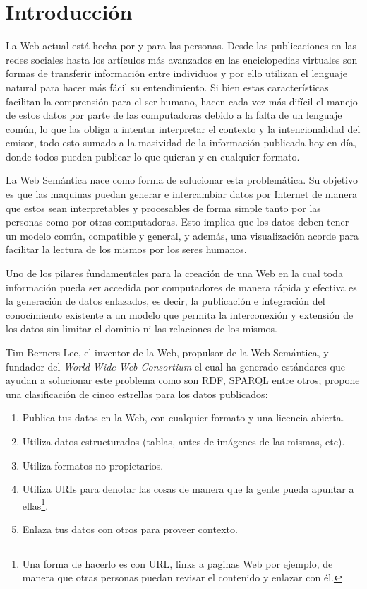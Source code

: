 
\chapter{Introducción}\label{ch:intro}

La Web actual está hecha por y para las personas. Desde las publicaciones en las
redes sociales hasta los artículos más avanzados en las enciclopedias virtuales
son formas de transferir información entre individuos y por ello utilizan el
lenguaje natural para hacer más fácil su entendimiento. Si bien estas
características facilitan la comprensión para el ser humano, hacen cada
vez más difícil el manejo de estos datos por parte de las computadoras debido a
la falta de un lenguaje común, lo que las obliga a intentar interpretar el
contexto y la intencionalidad del emisor, todo esto sumado a la masividad de la
información publicada hoy en día, donde todos pueden publicar lo que quieran y
en cualquier formato.

La Web Semántica nace como forma de solucionar esta problemática.
Su objetivo es que las maquinas puedan generar e intercambiar datos por Internet 
de manera que estos sean interpretables y procesables de forma simple tanto por
las personas como por otras computadoras.
Esto implica que los datos deben tener un modelo común, compatible y general,
y además, una visualización acorde para facilitar la lectura de los mismos por
los seres humanos.

Uno de los pilares fundamentales para la creación de una Web en la cual toda
información pueda ser accedida por computadores de manera rápida y efectiva es
la generación de datos enlazados, es decir, la publicación e integración del 
conocimiento existente a un modelo que permita la interconexión y extensión de
los datos sin limitar el dominio ni las relaciones de los mismos.

Tim Berners-Lee, el inventor de la Web, propulsor de la Web Semántica,
y fundador del \emph{World Wide Web Consortium} el cual ha generado estándares
que ayudan a solucionar este problema como son RDF, SPARQL entre otros;
propone una clasificación de cinco estrellas para los datos publicados:
\begin{enumerate}
  \item
    Publica tus datos en la Web, con cualquier formato y una licencia abierta.
  \item
    Utiliza datos estructurados (tablas, antes de imágenes de las mismas, etc).
  \item
    Utiliza formatos no propietarios.
  \item
    Utiliza URIs para denotar las cosas de manera que la gente pueda apuntar a
    ellas\footnote{
    Una forma de hacerlo es con URL, links a paginas Web por ejemplo, de manera
    que otras personas puedan revisar el contenido y enlazar con él.}.
  \item
    Enlaza tus datos con otros para proveer contexto.
\end{enumerate}

